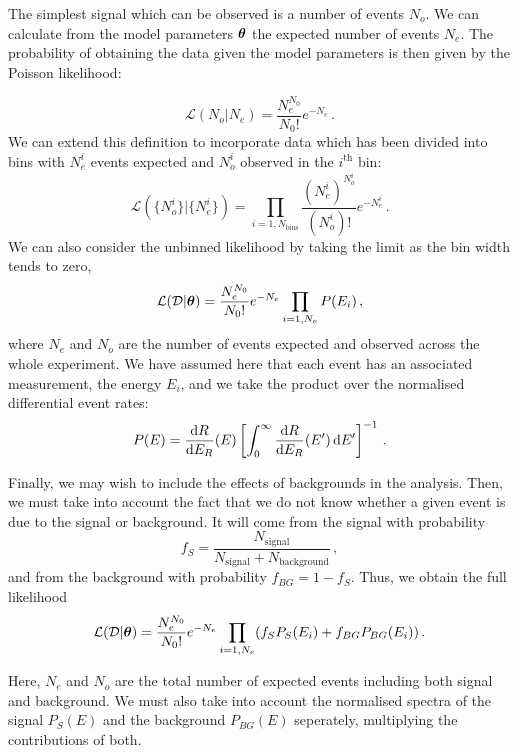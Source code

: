 The simplest signal which can be observed is a number of events $N_o$. We can calculate from the model parameters $\boldsymbol\theta$ the expected number of events $N_e$. The probability of obtaining the data given the model parameters is then given by the Poisson likelihood:

\begin{equation}
\mathcal{L}(N_o|N_e) = \frac{N_e^{N_0}}{N_0!}e^{-N_e}\,.
\end{equation}
We can extend this definition to incorporate data which has been divided into bins with $N_e^{i}$ events expected and $N_o^{i}$ observed in the $i^\textrm{th}$ bin:
\begin{equation}
\label{eq:ParamRecon:binnedL}
\mathcal{L}(\{N_o^{i}\}|\{N_e^{i}\}) = \prod_{i = 1,N_\textrm{bins}} \frac{(N_e^{i})^{N_o^{i}}}{(N_o^{i})!}e^{-N_e^{i}}\,.
\end{equation}
We can also consider the unbinned likelihood by taking the limit as the bin width tends to zero,
\begin{equation}
\label{eq:ParamRecon:unbinnedL}
\mathcal{L}(\mathcal{D}|\boldsymbol\theta) = \frac{N_e^{N_0}}{N_0!}e^{-N_e}\prod_{i = 1,N_e} P(E_i)\,,
\end{equation}
where $N_e$ and $N_o$ are the number of events expected and observed across the whole experiment. We have assumed here that each event has an associated measurement, the energy $E_i$, and we take the product over the normalised differential event rates:
\begin{equation}
P(E) = \frac{\mathrm{d}R}{\mathrm{d}E_R}(E)\left[\int_0^{\infty} \frac{\mathrm{d}R}{\mathrm{d}E_R}(E')\,\mathrm{d}E'\right]^{-1}\,.
\end{equation}

Finally, we may wish to include the effects of backgrounds in the analysis. Then, we must take into account the fact that we do not know whether a given event is due to the signal or background. It will come from the signal with probability
\begin{equation}
f_S = \frac{N_\textrm{signal}}{N_\textrm{signal} + N_\textrm{background}}\,,
\end{equation}
and from the background with probability $f_{BG} = 1-f_S$. Thus, we obtain the full likelihood
\begin{equation}
\mathcal{L}(\mathcal{D}|\boldsymbol\theta) = \frac{N_e^{N_0}}{N_0!}e^{-N_e}\prod_{i = 1,N_e} (f_S P_S(E_i) + f_{BG} P_{BG}(E_i)) \,.
\end{equation}

Here, $N_e$ and $N_o$ are the total number of expected events including both signal and background. We must also take into account the normalised spectra of the signal $P_S(E)$ and the background $P_{BG}(E)$ seperately, multiplying the contributions of both.

